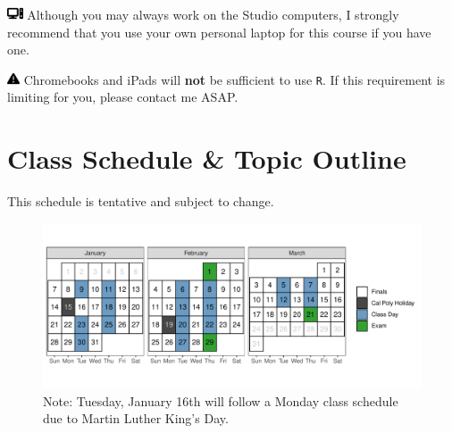\documentclass[
  11pt,
  letterpaper,
  DIV=11,
  numbers=noendperiod]{scrartcl}
\begin{document}
\includegraphics[width=1.25em,height=1em]{index_files/figure-pdf/fa-icon-200198f1a0ee0bd3b2404fd0ddb4d488.pdf}
Although you may always work on the Studio computers, I strongly
recommend that you use your own personal laptop for this course if you
have one.

\includegraphics[width=1em,height=1em]{index_files/figure-pdf/fa-icon-c41ef61dfed73f2cdfa3696207b9d436.pdf}
Chromebooks and iPads will \textbf{not} be sufficient to use \texttt{R}.
If this requirement is limiting for you, please contact me ASAP.

\newpage

\hypertarget{class-schedule-topic-outline}{%
\section{Class Schedule \& Topic
Outline}\label{class-schedule-topic-outline}}

This schedule is tentative and subject to change.

\begin{figure}[h]

{\centering \includegraphics{index_files/figure-pdf/calendar-1.pdf}

}

\caption{Note: Tuesday, January 16th will follow a Monday class schedule
due to Martin Luther King's Day.}

\end{figure}
\end{document}
